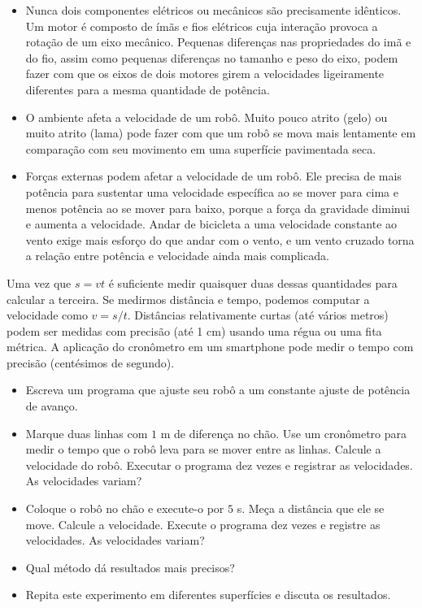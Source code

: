 \begin{itemize}
\item Nunca dois componentes elétricos ou mecânicos são precisamente idênticos. Um motor é composto de ímãs e fios elétricos cuja interação provoca a rotação de um eixo mecânico. Pequenas diferenças nas propriedades do imã e do fio, assim como pequenas diferenças no tamanho e peso do eixo, podem fazer com que os eixos de dois motores girem a velocidades ligeiramente diferentes para a mesma quantidade de potência.

\item O ambiente afeta a velocidade de um robô. Muito pouco atrito (gelo) ou muito atrito (lama) pode fazer com que um robô se mova mais lentamente em comparação com seu movimento em uma superfície pavimentada seca.

\item Forças externas podem afetar a velocidade de um robô. Ele precisa de mais potência para sustentar uma velocidade específica ao se mover para cima e menos potência ao se mover para baixo, porque a força da gravidade diminui e aumenta a velocidade. Andar de bicicleta a uma velocidade constante ao vento exige mais esforço do que andar com o vento, e um vento cruzado torna a relação entre potência e velocidade ainda mais complicada.
\end{itemize}

Uma vez que $s=vt$ é suficiente medir quaisquer duas dessas quantidades para calcular a terceira. Se medirmos distância e tempo, podemos computar a velocidade como $v=s/t$. Distâncias relativamente curtas (até vários metros) podem ser medidas com precisão (até 1 cm) usando uma régua ou uma fita métrica. A aplicação do cronômetro em um smartphone pode medir o tempo com precisão (centésimos de segundo).

\begin{framed}
\begin{itemize}
\item Escreva um programa que ajuste seu robô a um constante ajuste de potência de avanço.
\item Marque duas linhas com $1$ m de diferença no chão. Use um cronômetro para medir o tempo que o robô leva para se mover entre as linhas. Calcule a velocidade do robô. Executar o programa dez vezes e registrar as velocidades. As velocidades variam?
\item Coloque o robô no chão e execute-o por $5$ s. Meça a distância que ele se move. Calcule a velocidade. Execute o programa dez vezes e registre as velocidades. As velocidades variam?
\item Qual método dá resultados mais precisos?
\item Repita este experimento em diferentes superfícies e discuta os resultados.
\end{itemize}
\end{framed}

